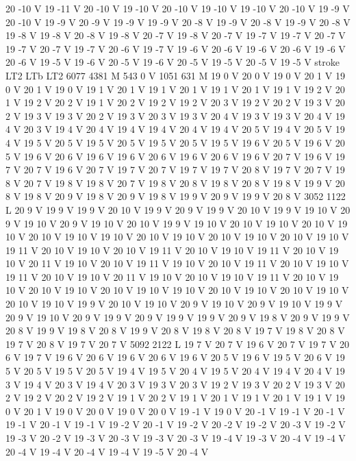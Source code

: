 {{{{{20 -10 V
19 -11 V
20 -10 V
19 -10 V
20 -10 V
19 -10 V
19 -10 V
20 -10 V
19 -9 V
20 -10 V
19 -9 V
20 -9 V
19 -9 V
19 -9 V
20 -8 V
19 -9 V
20 -8 V
19 -9 V
20 -8 V
19 -8 V
19 -8 V
20 -8 V
19 -8 V
20 -7 V
19 -8 V
20 -7 V
19 -7 V
19 -7 V
20 -7 V
19 -7 V
20 -7 V
19 -7 V
20 -6 V
19 -7 V
19 -6 V
20 -6 V
19 -6 V
20 -6 V
19 -6 V
20 -6 V
19 -5 V
19 -6 V
20 -5 V
19 -6 V
20 -5 V
19 -5 V
20 -5 V
19 -5 V
stroke
LT2
LTb
LT2
6077 4381 M
543 0 V
1051 631 M
19 0 V
20 0 V
19 0 V
20 1 V
19 0 V
20 1 V
19 0 V
19 1 V
20 1 V
19 1 V
20 1 V
19 1 V
20 1 V
19 1 V
19 2 V
20 1 V
19 2 V
20 2 V
19 1 V
20 2 V
19 2 V
19 2 V
20 3 V
19 2 V
20 2 V
19 3 V
20 2 V
19 3 V
19 3 V
20 2 V
19 3 V
20 3 V
19 3 V
20 4 V
19 3 V
19 3 V
20 4 V
19 4 V
20 3 V
19 4 V
20 4 V
19 4 V
19 4 V
20 4 V
19 4 V
20 5 V
19 4 V
20 5 V
19 4 V
19 5 V
20 5 V
19 5 V
20 5 V
19 5 V
20 5 V
19 5 V
19 6 V
20 5 V
19 6 V
20 5 V
19 6 V
20 6 V
19 6 V
19 6 V
20 6 V
19 6 V
20 6 V
19 6 V
20 7 V
19 6 V
19 7 V
20 7 V
19 6 V
20 7 V
19 7 V
20 7 V
19 7 V
19 7 V
20 8 V
19 7 V
20 7 V
19 8 V
20 7 V
19 8 V
19 8 V
20 7 V
19 8 V
20 8 V
19 8 V
20 8 V
19 8 V
19 9 V
20 8 V
19 8 V
20 9 V
19 8 V
20 9 V
19 8 V
19 9 V
20 9 V
19 9 V
20 8 V
3052 1122 L
20 9 V
19 9 V
19 9 V
20 10 V
19 9 V
20 9 V
19 9 V
20 10 V
19 9 V
19 10 V
20 9 V
19 10 V
20 9 V
19 10 V
20 10 V
19 9 V
19 10 V
20 10 V
19 10 V
20 10 V
19 10 V
20 10 V
19 10 V
19 10 V
20 10 V
19 10 V
20 10 V
19 10 V
20 10 V
19 10 V
19 11 V
20 10 V
19 10 V
20 10 V
19 11 V
20 10 V
19 10 V
19 11 V
20 10 V
19 10 V
20 11 V
19 10 V
20 10 V
19 11 V
19 10 V
20 10 V
19 11 V
20 10 V
19 10 V
19 11 V
20 10 V
19 10 V
20 11 V
19 10 V
20 10 V
19 10 V
19 11 V
20 10 V
19 10 V
20 10 V
19 10 V
20 10 V
19 10 V
19 10 V
20 10 V
19 10 V
20 10 V
19 10 V
20 10 V
19 10 V
19 9 V
20 10 V
19 10 V
20 9 V
19 10 V
20 9 V
19 10 V
19 9 V
20 9 V
19 10 V
20 9 V
19 9 V
20 9 V
19 9 V
19 9 V
20 9 V
19 8 V
20 9 V
19 9 V
20 8 V
19 9 V
19 8 V
20 8 V
19 9 V
20 8 V
19 8 V
20 8 V
19 7 V
19 8 V
20 8 V
19 7 V
20 8 V
19 7 V
20 7 V
5092 2122 L
19 7 V
20 7 V
19 6 V
20 7 V
19 7 V
20 6 V
19 7 V
19 6 V
20 6 V
19 6 V
20 6 V
19 6 V
20 5 V
19 6 V
19 5 V
20 6 V
19 5 V
20 5 V
19 5 V
20 5 V
19 4 V
19 5 V
20 4 V
19 5 V
20 4 V
19 4 V
20 4 V
19 3 V
19 4 V
20 3 V
19 4 V
20 3 V
19 3 V
20 3 V
19 2 V
19 3 V
20 2 V
19 3 V
20 2 V
19 2 V
20 2 V
19 2 V
19 1 V
20 2 V
19 1 V
20 1 V
19 1 V
20 1 V
19 1 V
19 0 V
20 1 V
19 0 V
20 0 V
19 0 V
20 0 V
19 -1 V
19 0 V
20 -1 V
19 -1 V
20 -1 V
19 -1 V
20 -1 V
19 -1 V
19 -2 V
20 -1 V
19 -2 V
20 -2 V
19 -2 V
20 -3 V
19 -2 V
19 -3 V
20 -2 V
19 -3 V
20 -3 V
19 -3 V
20 -3 V
19 -4 V
19 -3 V
20 -4 V
19 -4 V
20 -4 V
19 -4 V
20 -4 V
19 -4 V
19 -5 V
20 -4 V
}}}}}
